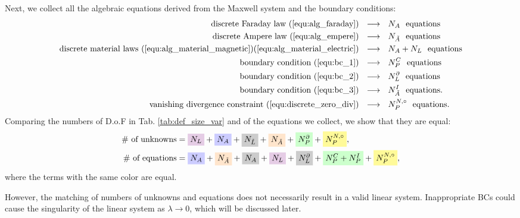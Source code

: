 \documentclass{article}
\begin{document}
Next, we collect all the algebraic equations derived from the Maxwell system and the boundary conditions: 
\begin{align*}
    \text{discrete Faraday law (\ref{equ:alg_faraday})} \ \ &\longrightarrow\ \  N_A \ \ \text{equations} \\
    \text{discrete Ampere law (\ref{equ:alg_empere})} \ \ &\longrightarrow\ \  N_{\Tilde{A}} \ \ \text{equations} \\
    \text{discrete material laws (\ref{equ:alg_material_magnetic})(\ref{equ:alg_material_electric})} \ \ &\longrightarrow\ \  N_A + N_L \ \ \text{equations} \\
    \text{boundary condition (\ref{equ:bc_1})} \ \ &\longrightarrow\ \  N_P^C \ \ \text{equations} \\
    \text{boundary condition (\ref{equ:bc_2})} \ \ &\longrightarrow\ \  N_L^\partial \ \ \text{equations} \\
    \text{boundary condition (\ref{equ:bc_3})} \ \ &\longrightarrow\ \  N_{\Tilde{A}}^I \ \ \text{equations}. \\
    \text{vanishing divergence constraint (\ref{equ:discrete_zero_div})} \ \ &\longrightarrow\ \  N_P^{N,\circ} \ \ \text{equations}. \\
\end{align*}
Comparing the numbers of D.o.F in Tab. \ref{tab:def_size_var} and of the equations we collect, we show that they are equal:
\begin{align*}
    \#\text{ of unknowns} &= \colorbox{violet!20}{$N_L$} + \colorbox{blue!20}{$N_A$} + \colorbox{gray!40}{$N_{\Tilde{L}}$} + \colorbox{orange!20}{$N_{\Tilde{A}}$} + \colorbox{green!20}{$N_P^\partial$} + \colorbox{yellow!40}{$N_P^{N,\circ}$}, \\
    \#\text{ of equations} &= \colorbox{blue!20}{$N_A$} + \colorbox{orange!20}{$N_{\Tilde{A}}$} + \colorbox{gray!40}{$N_A$} + \colorbox{violet!20}{$N_L$} + \colorbox{gray!40}{$N_L^\partial$} + \colorbox{green!20}{$N_P^C + N_P^I$}+ \colorbox{yellow!40}{$N_P^{N,\circ}$},
\end{align*}
where the terms with the same color are equal.

However, the matching of numbers of unknowns and equations does not necessarily result in a valid linear system. Inappropriate BCs could cause the singularity of the linear system as $\lambda \rightarrow 0$, which will be discussed later. 
\end{document}
